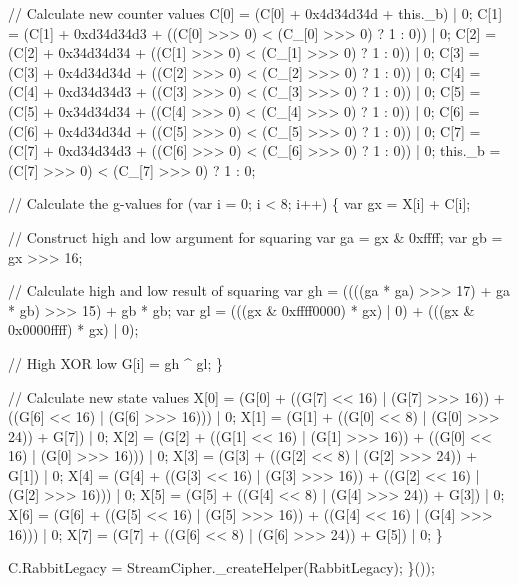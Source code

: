 \begin{DoxyCodeInclude}
        \textcolor{comment}{// Calculate new counter values}
        C[0] = (C[0] + 0x4d34d34d + this.\_b) | 0;
        C[1] = (C[1] + 0xd34d34d3 + ((C[0] >>> 0) < (C\_[0] >>> 0) ? 1 : 0)) | 0;
        C[2] = (C[2] + 0x34d34d34 + ((C[1] >>> 0) < (C\_[1] >>> 0) ? 1 : 0)) | 0;
        C[3] = (C[3] + 0x4d34d34d + ((C[2] >>> 0) < (C\_[2] >>> 0) ? 1 : 0)) | 0;
        C[4] = (C[4] + 0xd34d34d3 + ((C[3] >>> 0) < (C\_[3] >>> 0) ? 1 : 0)) | 0;
        C[5] = (C[5] + 0x34d34d34 + ((C[4] >>> 0) < (C\_[4] >>> 0) ? 1 : 0)) | 0;
        C[6] = (C[6] + 0x4d34d34d + ((C[5] >>> 0) < (C\_[5] >>> 0) ? 1 : 0)) | 0;
        C[7] = (C[7] + 0xd34d34d3 + ((C[6] >>> 0) < (C\_[6] >>> 0) ? 1 : 0)) | 0;
        this.\_b = (C[7] >>> 0) < (C\_[7] >>> 0) ? 1 : 0;

        \textcolor{comment}{// Calculate the g-values}
        \textcolor{keywordflow}{for} (var i = 0; i < 8; i++) \{
            var gx = X[i] + C[i];

            \textcolor{comment}{// Construct high and low argument for squaring}
            var ga = gx & 0xffff;
            var gb = gx >>> 16;

            \textcolor{comment}{// Calculate high and low result of squaring}
            var gh = ((((ga * ga) >>> 17) + ga * gb) >>> 15) + gb * gb;
            var gl = (((gx & 0xffff0000) * gx) | 0) + (((gx & 0x0000ffff) * gx) | 0);

            \textcolor{comment}{// High XOR low}
            G[i] = gh ^ gl;
        \}

        \textcolor{comment}{// Calculate new state values}
        X[0] = (G[0] + ((G[7] << 16) | (G[7] >>> 16)) + ((G[6] << 16) | (G[6] >>> 16))) | 0;
        X[1] = (G[1] + ((G[0] << 8)  | (G[0] >>> 24)) + G[7]) | 0;
        X[2] = (G[2] + ((G[1] << 16) | (G[1] >>> 16)) + ((G[0] << 16) | (G[0] >>> 16))) | 0;
        X[3] = (G[3] + ((G[2] << 8)  | (G[2] >>> 24)) + G[1]) | 0;
        X[4] = (G[4] + ((G[3] << 16) | (G[3] >>> 16)) + ((G[2] << 16) | (G[2] >>> 16))) | 0;
        X[5] = (G[5] + ((G[4] << 8)  | (G[4] >>> 24)) + G[3]) | 0;
        X[6] = (G[6] + ((G[5] << 16) | (G[5] >>> 16)) + ((G[4] << 16) | (G[4] >>> 16))) | 0;
        X[7] = (G[7] + ((G[6] << 8)  | (G[6] >>> 24)) + G[5]) | 0;
    \}

    C.RabbitLegacy = StreamCipher.\_createHelper(RabbitLegacy);
\}());
\end{DoxyCodeInclude}
 